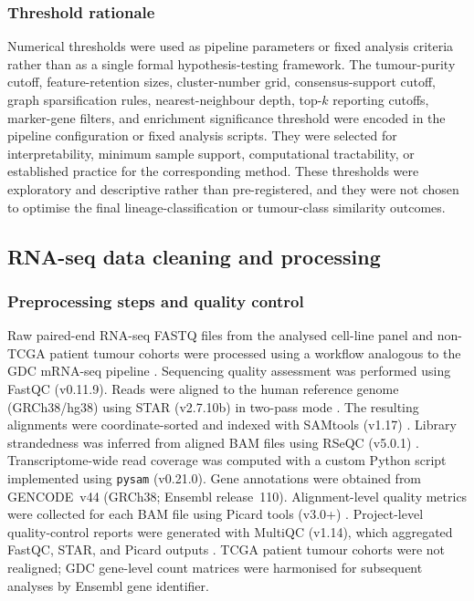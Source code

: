 \subsubsection{Threshold rationale}

Numerical thresholds were used as pipeline parameters or fixed analysis criteria rather than as a single formal hypothesis-testing framework. The tumour-purity cutoff, feature-retention sizes, cluster-number grid, consensus-support cutoff, graph sparsification rules, nearest-neighbour depth, top-\(k\) reporting cutoffs, marker-gene filters, and enrichment significance threshold were encoded in the pipeline configuration or fixed analysis scripts. They were selected for interpretability, minimum sample support, computational tractability, or established practice for the corresponding method. These thresholds were exploratory and descriptive rather than pre-registered, and they were not chosen to optimise the final lineage-classification or tumour-class similarity outcomes.



\subsection{RNA-seq data cleaning and processing}

\subsubsection{Preprocessing steps and quality control}

Raw paired-end RNA-seq FASTQ files from the analysed cell-line panel and non-TCGA patient tumour cohorts were processed using a workflow analogous to the GDC mRNA-seq pipeline \citep{GDCpipeline}. Sequencing quality assessment was performed using FastQC (v0.11.9). Reads were aligned to the human reference genome (GRCh38/hg38) using STAR (v2.7.10b) in two-pass mode \citep{Dobin2013}. The resulting alignments were coordinate-sorted and indexed with SAMtools (v1.17) \citep{Danecek2021}. Library strandedness was inferred from aligned BAM files using RSeQC (v5.0.1) \citep{Wang2012}. Transcriptome-wide read coverage was computed with a custom Python script implemented using \texttt{pysam} (v0.21.0). Gene annotations were obtained from GENCODE~v44 (GRCh38; Ensembl release~110). Alignment-level quality metrics were collected for each BAM file using Picard tools (v3.0+) \citep{Picard2019}. Project-level quality-control reports were generated with MultiQC (v1.14), which aggregated FastQC, STAR, and Picard outputs \citep{Ewels2016}. TCGA patient tumour cohorts were not realigned; GDC gene-level count matrices were harmonised for subsequent analyses by Ensembl gene identifier.


